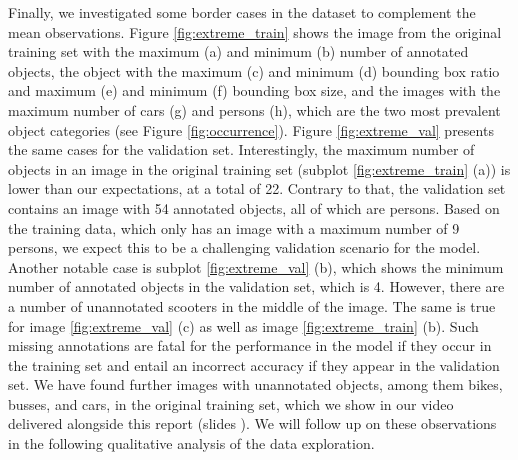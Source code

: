 \documentclass{article}
\begin{document}
Finally, we investigated some border cases in the dataset to complement the mean observations. Figure \ref{fig:extreme_train} shows the image from the original training set with the maximum (a) and minimum (b) number of annotated objects, the object with the maximum (c) and minimum (d) bounding box ratio and maximum (e) and minimum (f) bounding box size, and the images with the maximum number of cars (g) and persons (h), which are the two most prevalent object categories (see Figure \ref{fig:occurrence}). Figure \ref{fig:extreme_val} presents the same cases for the validation set. Interestingly, the maximum number of objects in an image in the original training set (subplot \ref{fig:extreme_train} (a)) is lower than our expectations, at a total of 22. Contrary to that, the validation set contains an image with 54 annotated objects, all of which are persons. Based on the training data, which only has an image with a maximum number of 9 persons, we expect this to be a challenging validation scenario for the model. Another notable case is subplot \ref{fig:extreme_val} (b), which shows the minimum number of annotated objects in the validation set, which is 4. However, there are a number of unannotated scooters in the middle of the image. The same is true for image \ref{fig:extreme_val} (c) as well as image \ref{fig:extreme_train} (b). Such missing annotations are fatal for the performance in the model if they occur in the training set \cite{xu2019missing} and entail an incorrect accuracy if they appear in the validation set. We have found further images with unannotated objects, among them bikes, busses, and cars, in the original training set, which we show in our video delivered alongside this report (slides {\color{red}{a-b}}). We will follow up on these observations in the following qualitative analysis of the data exploration.
\end{document}
